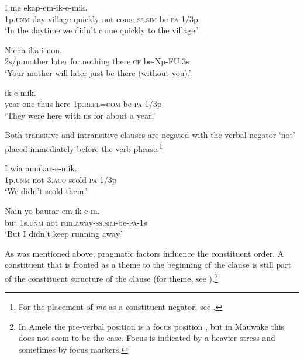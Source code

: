\ea%
\label{ex:x915}
\gll I      me  ekap-em-ik-e-mik. \\
     1p.\textsc{unm}  day  village  quickly  not  come-\textsc{ss}.\textsc{sim}-be-\textsc{pa}-1/3p \\
\glt `In the daytime we didn't come quickly to the village.'
\z

\ea%
\label{ex:x918}
\gll Niena      ika-i-non. \\
     2s/p.mother  later  for.nothing  there.\textsc{cf}  be-Np-\textsc{FU}.3s \\
\glt `Your mother will later just be there (without you).'
\z

\ea%
\label{ex:x919}
\gll {}        ik-e-mik. \\
     year  one  thus  here  1p.\textsc{refl}=\textsc{com}  be-\textsc{pa}-1/3p \\
\glt `They were here with us for about a year.' 
\z

Both transitive and intransitive clauses are negated with the verbal negator  `not' placed immediately before the verb phrase.\footnote{For the placement of \textit{me} as a constituent negator, see .} 

\ea%
\label{ex:x981}
\gll I    wia  amukar-e-mik. \\
     1p.\textsc{unm}  not  3.\textsc{acc}  scold-\textsc{pa}-1/3p \\
\glt `We didn't scold them.'
\z

\ea%
\label{ex:x1057}
\gll Nain  yo    baurar-em-ik-e-m. \\
     but  1s.\textsc{unm}  not  run.away-\textsc{ss}.\textsc{sim}-be-\textsc{pa}-1s \\
\glt `But I didn't keep running away.'
\z

As was mentioned above, pragmatic factors influence the constituent order.  A constituent that is fronted as a theme to the beginning of the clause is still part of the constituent structure of the clause (for theme, see ).\footnote{In Amele the pre-verbal position is a focus position \citep[142]{Roberts1987}, but in Mauwake this does not seem to be the case. Focus is indicated by a heavier stress and sometimes by focus markers.} 


